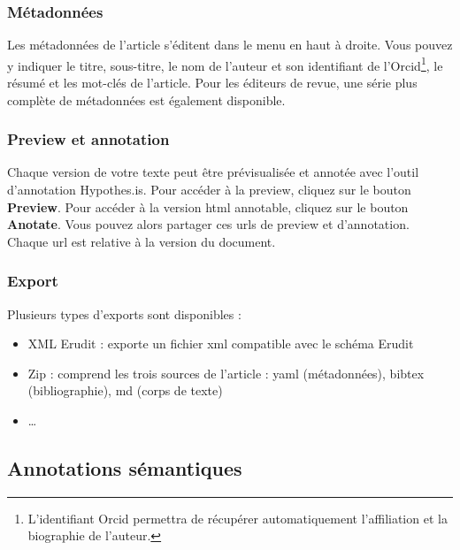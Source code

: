 \documentclass[12pt,french,letterpaper]{article}
\providecommand{\tightlist}{%
  \setlength{\itemsep}{0pt}\setlength{\parskip}{0pt}}
\begin{document}
\hypertarget{muxe9tadonnuxe9es}{%
\subsubsection{Métadonnées}\label{muxe9tadonnuxe9es}}

Les métadonnées de l'article s'éditent dans le menu en haut à droite.
Vous pouvez y indiquer le titre, sous-titre, le nom de l'auteur et son
identifiant de l'Orcid\footnote{L'identifiant Orcid permettra de
  récupérer automatiquement l'affiliation et la biographie de l'auteur.},
le résumé et les mot-clés de l'article. Pour les éditeurs de revue, une
série plus complète de métadonnées est également disponible.

\hypertarget{preview-et-annotation}{%
\subsubsection{Preview et annotation}\label{preview-et-annotation}}

Chaque version de votre texte peut être prévisualisée et annotée avec
l'outil d'annotation Hypothes.is. Pour accéder à la preview, cliquez sur
le bouton \textbf{Preview}. Pour accéder à la version html annotable,
cliquez sur le bouton \textbf{Anotate}. Vous pouvez alors partager ces
urls de preview et d'annotation. Chaque url est relative à la version du
document.

\hypertarget{export}{%
\subsubsection{Export}\label{export}}

Plusieurs types d'exports sont disponibles :

\begin{itemize}
\tightlist
\item
  XML Erudit : exporte un fichier xml compatible avec le schéma Erudit
\item
  Zip : comprend les trois sources de l'article : yaml (métadonnées),
  bibtex (bibliographie), md (corps de texte)
\item
  \ldots{}
\end{itemize}

\hypertarget{annotations-suxe9mantiques}{%
\subsection{Annotations sémantiques}\label{annotations-suxe9mantiques}}
\end{document}
